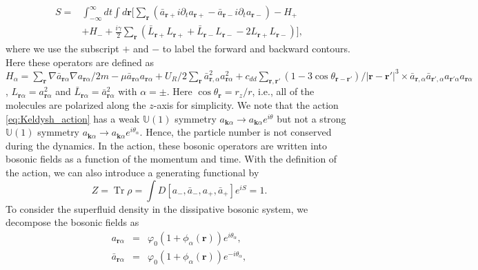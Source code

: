 \documentclass[aps,prl,twocolumn,superscriptaddress,]{revtex4-1}
\newcommand{\tmmathbf}[1]{\ensuremath{\boldsymbol{#1}}}
\newcommand{\tmop}[1]{\ensuremath{\operatorname{#1}}}
\begin{document}
\begin{equation}
	\begin{aligned}S= & \int_{-\infty}^{\infty}dt\int d\bm{r}[\sum_{\tmmathbf{r}}(\bar{a}_{\tmmathbf{r}+}i\partial_{t}a_{\tmmathbf{r}+}-\bar{a}_{\tmmathbf{r}-}i\partial_{t}a_{\tmmathbf{r}-})-H_{+}\\&+H_{-}
		+\frac{i\gamma}{2}\sum_{\tmmathbf{r}}(\bar{L}_{\tmmathbf{r}+}L_{\tmmathbf{r}+}+\bar{L}_{\tmmathbf{r}-}L_{\tmmathbf{r}-}-2L_{\tmmathbf{r}+}L_{\tmmathbf{r}-})],
	\end{aligned}
	\label{eq:Keldysh_action}
\end{equation}
where we use the subscript $+$ and $-$ to label the forward and
backward contours. Here these operators are defined as $H_{\alpha}=\sum_{\tmmathbf{r}}\nabla\bar{a}_{\tmmathbf{r}\alpha}\nabla a_{\tmmathbf{r}\alpha}/2m-\mu \bar{a}_{\bm{r}\alpha}a_{\bm{r}\alpha}+U_{R}/2\sum_{\tmmathbf{r}}\bar{a}_{\tmmathbf{r},\alpha}^{2}a_{\tmmathbf{r}\alpha}^{2}+c_{dd}\sum_{\tmmathbf{r},\bm{r}'}(1-3\cos\theta_{\bm{r}-\bm{r}'})/|\bm{r}-\bm{r}'|^3\times\bar{a}_{\tmmathbf{r},\alpha}\bar{a}_{\tmmathbf{r}',\alpha}a_{\tmmathbf{r}'\alpha}a_{\tmmathbf{r}\alpha}$,
$L_{\tmmathbf{r}\alpha}=a_{\tmmathbf{r}\alpha}^{2}$ and $\bar{L}_{\tmmathbf{r}\alpha}=\bar{a}_{\tmmathbf{r}\alpha}^{2}$
with $\alpha=\pm$. Here $\cos{\theta_{\bm{r}}}=r_z/r$, i.e., all of the molecules are polarized along the $z$-axis for simplicity.
We note that the action \eqref{eq:Keldysh_action}
has a weak $\mathbb{U}(1)$ symmetry $a_{\tmmathbf{k}\alpha}\rightarrow a_{\tmmathbf{k}\alpha}e^{i\theta}$
but not a strong $\mathbb{U}(1)$ symmetry $a_{\tmmathbf{k}\alpha}\rightarrow a_{\tmmathbf{k}\alpha}e^{i\theta_{\alpha}}$. Hence, the particle number is
not conserved during the dynamics. In the action, these bosonic operators are written
into bosonic fields as a function of the momentum and time. With the
definition of the action, we can also introduce a generating functional
by 
\begin{equation}
Z=\tmop{Tr}\rho=\int D[a_{-},\bar{a}_{-},a_{+},\bar{a}_{+}]e^{iS}=1.
\end{equation}
To consider the superfluid density in the dissipative bosonic system, we decompose the bosonic fields
as \citep{Wen2007}
\begin{eqnarray}
a_{\tmmathbf{r}\alpha} & = & \varphi_{0}(1+\phi_{\alpha}(\tmmathbf{r}))e^{i\theta_{\alpha}},\nonumber \\
\bar{a}_{\tmmathbf{r}\alpha} & = & \varphi_{0}(1+\phi_{\alpha}(\tmmathbf{r}))e^{-i\theta_{\alpha}},
\end{eqnarray}
\end{document}
